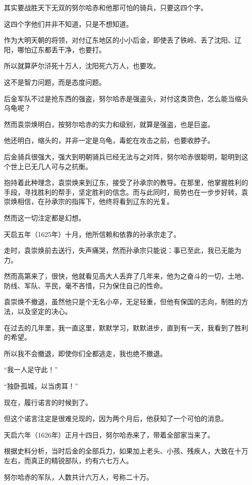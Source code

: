 \begin{multicols}{\theparacolNo}
		其实要战胜天下无双的努尔哈赤和他那可怕的骑兵，只要这四个字。

		这四个字他们并非不知道，只是不想知道。

		作为大明天朝的将领，对付辽东地区的小小后金，即使丢了铁岭、丢了沈阳、辽阳，哪怕辽东都丢干净，也要打。

		所以就算萨尔浒死十万人，沈阳死六万人，也要攻。

		这不是智力问题，而是态度问题。

		后金军队不过是抢东西的强盗，努尔哈赤是强盗头，对付这类货色，怎么能当缩头乌龟呢？

		然而袁崇焕明白，按努尔哈赤的实力和级别，就算是强盗，也是巨盗。

		他还明白，缩头的，并非一定是乌龟，毒蛇在攻击之前，也要收脖子。

		后金骑兵很强大，强大到明朝骑兵已经无法与之对阵，努尔哈赤很聪明，聪明到这个世上已无几人可与之抗衡。

		抱持着此种理念，袁崇焕来到辽东，接受了孙承宗的教导。在那里，他掌握胜利的手段，寻找胜利的帮手，坚定胜利的信念。而与此同时，局势也在一步步好转，袁崇焕相信，在孙承宗的指挥下，他终将看到辽东的光复。

		然而这一切注定都是幻想。

		天启五年（1625年）十月，他所信赖和依靠的孙承宗走了。

		走时，袁崇焕前去送行，失声痛哭，然而孙承宗只能说：事已至此，我已无能为力。

		然而高第来了，很快，他就看见高大人丢弃了几年来，他为之奋斗的一切，土地、防线、军队、平民，毫不吝惜，只为保住自己的性命。

		袁崇焕不撤退，虽然他只是个无名小卒，无足轻重，但他有保国的志向，制胜的方法，以及坚定的决心。

		在过去的几年里，我一直这里，默默学习，默默进步，直到有一天，我看到了胜利的希望。

		所以我不会撤退，即使你们全都逃走，我也绝不撤退。

		“我一人足守此！”

		“独卧孤城，以当虏耳！”

		现在，履行诺言的时候到了。

		但这个诺言注定是很难兑现的，因为两个月后，他获知了一个可怕的消息。

		天启六年（1626年）正月十四日，努尔哈赤来了，带着全部家当来了。

		根据史料分析，当时后金的全部兵力，如果加上老头、小孩、残疾人，大致在十万左右，而真正的精锐部队，约有六七万人。

		努尔哈赤的军队，人数共计六万人，号称二十万。


\end{multicols}
